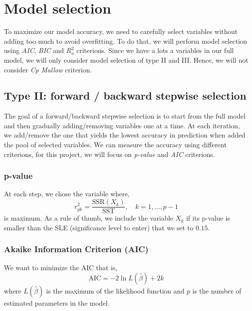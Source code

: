 \section{Model selection}

To maximize our model accuracy, we need to carefully select variables without adding too much to avoid overfitting. To do that, we will perform model selection using \textit{AIC}, \textit{BIC} and \textit{$R^2_a$} criterions. Since we have a lots a variables in our full model, we will only consider model selection of type II and III. Hence, we will not consider \textit{Cp Mallow} criterion.

\subsection{Type II: forward / backward stepwise selection}

The goal of a forward/backward stepwise selection is to start from the full model and then gradually adding/removing variables one at a time. At each iteration, we add/remove the one that yields the lowest accuracy in prediction when added the pool of selected variables. We can measure the accuracy using different criterions, for this project, we will focus on \textit{p-value} and \textit{AIC} criterions.

\subsubsection{p-value}

At each step, we chose the variable where, 
\begin{equation}
	r^2_{yk} = \frac{\text{SSR}(X_k)}{\text{SST}}, \quad k = 1,\dots,p-1
\end{equation}
is maximum. As a rule of thumb, we include the variable $X_k$ if its p-value is smaller than the SLE (significance level to enter) that we set to $0.15$.

\subsubsection{Akaike Information Criterion (AIC)}

We want to minimize the AIC that is,
\begin{equation}
	\text{AIC} = - 2 \ln L(\hat{\beta}) + 2k
\end{equation} 
where $L(\hat{\beta})$ is the maximum of the likelihood function and $p$ is the number of estimated parameters in the model.

